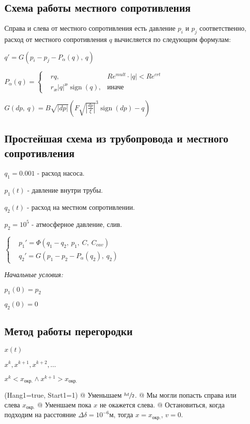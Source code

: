 \documentclass[12pt, a4paper]{article}
\DeclareMathOperator{\sign}{sign}
\begin{document}
\subsection{Схема работы местного сопротивления}

Справа и слева от местного сопротивления есть давление $p_i$ и $p_j$ соответственно, расход от местного сопротивления $q$ вычисляется по следующим формулам:

$ q' = G(p_i-p_j-P_\alpha(q),\ q) $

$
P_\alpha(q) = \left\{
\begin{aligned}
&rq,  &Re^{mult} \cdot |q| < Re^{crt} \\
&r_\text{\ae}|q|^\text{\ae}\sign(q), & \text{иначе}
\end{aligned}
\right.
$

$ G(dp,\ q) = B\sqrt{|dp|}\left(F\sqrt{\left|\frac{dp}{\xi}\right|}^3\sign(dp) - q\right) $

\subsection{Простейшая схема из трубопровода и местного сопротивления}

$ q_1 = 0.001 $ - расход насоса.

$ p_1(t) $ - давление внутри трубы.

$ q_2(t) $ - расход на местном сопротивлении.

$ p_2 = 10^5 $ - атмосферное давление, слив.

$ \left\{\begin{aligned}
& p_1' = \Phi(q_1 - q_2,\ p_1,\ C,\ C_{cav}) \\
& q_2' = G(p_1-p_2-P_\alpha(q_2),\ q_2)
\end{aligned}\right. $

\textit{Начальные условия:}

$ p_1(0) = p_2 $

$ q_2(0) = 0 $

\subsection{Метод работы перегородки}

$ x(t) $

$ x^k, x^{k+1}, x^{k+2}, \dots $

$ x^k < x_\text{окр.} \wedge x^{k+1} > x_\text{окр.} $

\noindent\begin{easylist}
\ListProperties(Hang1=true, Start1=1)
@ Уменьшаем $\sfrac{ht}{2}$.
@ Мы могли попасть справа или слева $x_\text{окр.}$
@ Уменшаем пока $x$ не окажется слева.
@ Остановиться, когда подходим на расстояние $\Delta\delta = 10^{-6} \text{м}$, тогда $x = x_{\text{окр.}}$, $v = 0$.
\end{easylist}
\end{document}
